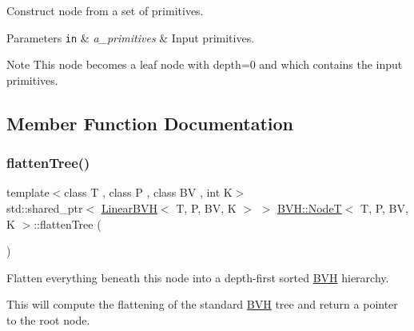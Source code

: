 Construct node from a set of primitives. 


\begin{DoxyParams}[1]{Parameters}
\mbox{\tt in}  & {\em a\+\_\+primitives} & Input primitives. \\
\hline
\end{DoxyParams}
\begin{DoxyNote}{Note}
This node becomes a leaf node with depth=0 and which contains the input primitives. 
\end{DoxyNote}


\subsection{Member Function Documentation}
\mbox{\label{classBVH_1_1NodeT_a926e3990022ab28821d3f51e5fead023}} 
\subsubsection{\texorpdfstring{flatten\+Tree()}{flattenTree()}\hspace{0.1cm}{\footnotesize\ttfamily [1/2]}}
{\footnotesize\ttfamily template$<$class T , class P , class BV , int K$>$ \\
std\+::shared\+\_\+ptr$<$ \hyperlink{classBVH_1_1LinearBVH}{Linear\+B\+VH}$<$ T, P, BV, K $>$ $>$ \hyperlink{classBVH_1_1NodeT}{B\+V\+H\+::\+NodeT}$<$ T, P, BV, K $>$\+::flatten\+Tree (\begin{DoxyParamCaption}{ }\end{DoxyParamCaption})\hspace{0.3cm}{\ttfamily [inline]}}



Flatten everything beneath this node into a depth-\/first sorted \hyperlink{namespaceBVH}{B\+VH} hierarchy. 

This will compute the flattening of the standard \hyperlink{namespaceBVH}{B\+VH} tree and return a pointer to the root node. \mbox{\label{classBVH_1_1NodeT_a14f014426b00ad7989af328fa369bca8}} 
